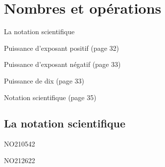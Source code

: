 \documentclass[a4paper,11pt]{report}
\begin{document}
\newcommand{\chapterName}{Nombres et opérations}
\newcommand{\serieName}{La notation scientifique}

\chapter*{\chapterName}
\thispagestyle{empty}

\begin{amL}{\serieName}{
\item Puissance d'exposant positif (page 32)
\item Puissance d'exposant négatif (page 33)
\item Puissance de dix (page 33)
\item Notation scientifique (page 35)
}\end{amL}

\section*{\serieName}
\setcounter{page}{1}















\begin{exol}{NO210}{54}{2} %
\end{exol}

\begin{exof}{NO212}{62}{2} %
\end{exof}
\end{document}
